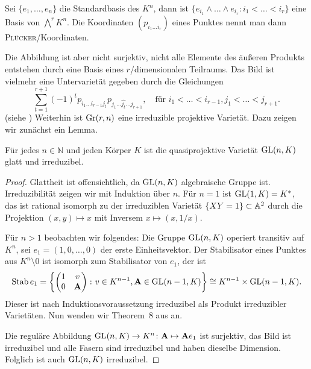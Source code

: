 Sei $\{e_1, \dots, e_n\}$ die Standardbasis des $K^n$, dann ist $\{e_{i_1} \wedge \dots \wedge e_{i_r} \colon i_1 < \dots < i_r\}$ eine Basis von $\bigwedge^r K^n$. Die Koordinaten $(p_{i_1 \dots i_r})$ eines Punktes nennt man dann \textsc{Plücker}\-/Koordinaten.

Die Abbildung ist aber nicht surjektiv, nicht alle Elemente des äußeren Produkts entstehen durch eine Basis eines $r$\-/dimensionalen Teilraums. Das Bild ist vielmehr eine Untervarietät gegeben durch die Gleichungen
\begin{equation} \label{eq:grcond}
\sum_{t=1}^{r+1} (-1)^t p_{i_1 \dots i_{r-1} j_t} p_{j_1 \dots \hat{j_t} \dots j_{r+1}}, \quad\text{für } i_1 < \dots < i_{r-1}, j_1 < \dots < j_{r+1}.
\end{equation}
(siehe \cite[S.~42]{Shafarevich}) Weiterhin ist $\grass r/n$ eine irreduzible projektive Varietät. Dazu zeigen wir zunächst ein Lemma.

\begin{prop}
Für jedes $n \in \mathbb N$ und jeden Körper $K$ ist die quasiprojektive Varietät $\mathrm{GL}(n,K)$ glatt und irreduzibel.
\end{prop}
\begin{proof}
Glattheit ist offensichtlich, da $\mathrm{GL}(n,K)$ algebraische Gruppe ist. Irreduzibilität zeigen wir mit Induktion über $n$. Für $n=1$ ist $\mathrm{GL}(1,K) = K^*$, das ist rational isomorph zu der irreduziblen Varietät $\{ XY = 1 \} \subset \mathbb A^{2}$ durch die Projektion $(x,y) \mapsto x$ mit Inversem $x \mapsto (x,1/x)$.

Für $n>1$ beobachten wir folgendes: Die Gruppe $\mathrm{GL}(n,K)$ operiert transitiv auf $K^n$, sei $e_1 = (1,0,\dots,0)$ der erste Einheitsvektor. Der Stabilisator eines Punktes aus $K^n \setminus 0$ ist isomorph zum Stabilisator von $e_1$, der ist
\begin{equation}
\operatorname{Stab} e_1 = \left\{ \begin{pmatrix}
1 & v \\
0 & \mathbf{A}
\end{pmatrix} \colon v \in K^{n-1}, \mathbf{A} \in \mathrm{GL}(n-1,K) \right\} \cong K^{n-1} \times \mathrm{GL}(n-1,K).
\end{equation}
Dieser ist nach Induktionsvoraussetzung irreduzibel als Produkt irreduzibler Varietäten. Nun wenden wir Theorem~8 aus \cite[S.~77]{Shafarevich} an.

Die reguläre Abbildung $\mathrm{GL}(n,K) \rightarrow K^n \colon \mathbf{A} \mapsto \mathbf{A} e_1$ ist surjektiv, das Bild ist irreduzibel und alle Fasern sind irreduzibel und haben dieselbe Dimension. Folglich ist auch $\mathrm{GL}(n,K)$ irreduzibel.
\end{proof}

